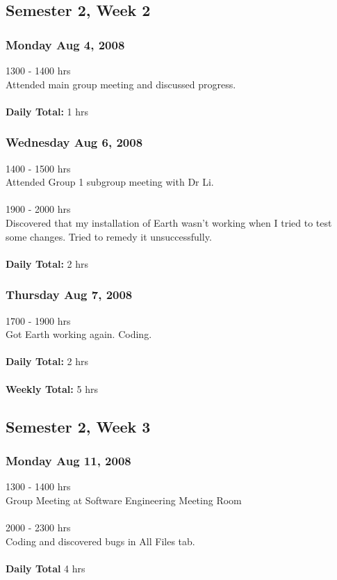 \documentclass[10pt, a4]{article}
\begin{document}
\subsection*{Semester 2, Week 2}
\subsubsection*{Monday Aug 4, 2008}
1300 - 1400 hrs\\
Attended main group meeting and discussed progress.\\
\\
\textbf{Daily Total:} 1 hrs

\subsubsection*{Wednesday Aug 6, 2008}
1400 - 1500 hrs\\
Attended Group 1 subgroup meeting with Dr Li.\\
\\
1900 - 2000 hrs\\
Discovered that my installation of Earth wasn't working when I tried to test some changes. Tried to remedy it unsuccessfully.\\
\\
\textbf{Daily Total:} 2 hrs\\

\subsubsection*{Thursday Aug 7, 2008}
1700 - 1900 hrs\\
Got Earth working again. Coding.\\
\\
\textbf{Daily Total:} 2 hrs\\
\\
\textbf{Weekly Total:} 5 hrs

\subsection*{Semester 2, Week 3}
\subsubsection*{Monday Aug 11, 2008}
1300 - 1400 hrs\\
Group Meeting at Software Engineering Meeting Room\\
\\
2000 - 2300 hrs\\
Coding and discovered bugs in All Files tab.\\
\\
\textbf{Daily Total} 4 hrs\\
\end{document}
